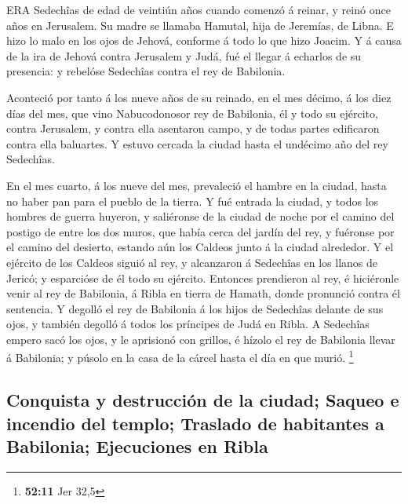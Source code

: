  ERA Sedechîas de edad de veintiún años cuando comenzó á
reinar, y reinó once años en Jerusalem. Su madre se llamaba Hamutal,
hija de Jeremías, de Libna.  E hizo lo malo en los ojos de
Jehová, conforme á todo lo que hizo Joacim.  Y á causa de la
ira de Jehová contra Jerusalem y Judá, fué el llegar á echarlos de su
presencia: y rebelóse Sedechîas contra el rey de Babilonia.

 Aconteció por tanto á los nueve años de su reinado, en el
mes décimo, á los diez días del mes, que vino Nabucodonosor rey de
Babilonia, él y todo su ejército, contra Jerusalem, y contra ella
asentaron campo, y de todas partes edificaron contra ella baluartes.
 Y estuvo cercada la ciudad hasta el undécimo año del rey
Sedechîas.

 En el mes cuarto, á los nueve del mes, prevaleció el hambre
en la ciudad, hasta no haber pan para el pueblo de la tierra.
 Y fué entrada la ciudad, y todos los hombres de guerra
huyeron, y saliéronse de la ciudad de noche por el camino del postigo de
entre los dos muros, que había cerca del jardín del rey, y fuéronse por
el camino del desierto, estando aún los Caldeos junto á la ciudad
alrededor.  Y el ejército de los Caldeos siguió al rey, y
alcanzaron á Sedechîas en los llanos de Jericó; y esparcióse de él todo
su ejército.  Entonces prendieron al rey, é hiciéronle venir
al rey de Babilonia, á Ribla en tierra de Hamath, donde pronunció contra
él sentencia.  Y degolló el rey de Babilonia á los hijos de
Sedechîas delante de sus ojos, y también degolló á todos los príncipes
de Judá en Ribla.  A Sedechîas empero sacó los ojos, y le
aprisionó con grillos, é hízolo el rey de Babilonia llevar á Babilonia;
y púsolo en la casa de la cárcel hasta el día en que murió. \footnote{\textbf{52:11}
  Jer 32,5}

\hypertarget{conquista-y-destrucciuxf3n-de-la-ciudad-saqueo-e-incendio-del-templo-traslado-de-habitantes-a-babilonia-ejecuciones-en-ribla}{%
\subsection{Conquista y destrucción de la ciudad; Saqueo e incendio del
templo; Traslado de habitantes a Babilonia; Ejecuciones en
Ribla}\label{conquista-y-destrucciuxf3n-de-la-ciudad-saqueo-e-incendio-del-templo-traslado-de-habitantes-a-babilonia-ejecuciones-en-ribla}}

